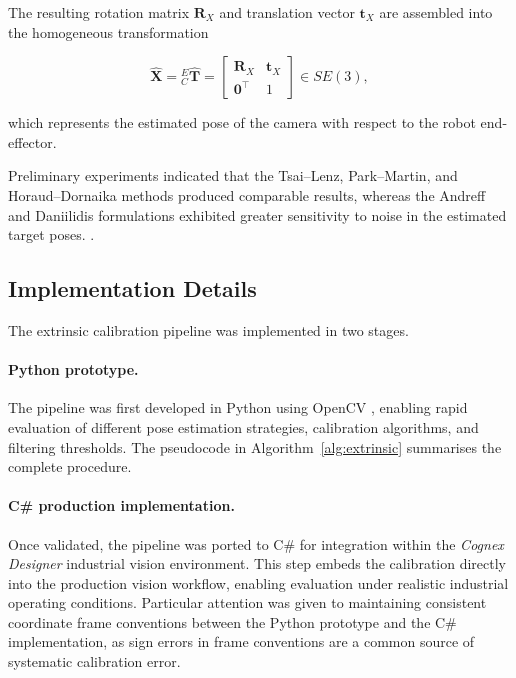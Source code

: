 The resulting rotation matrix $\mathbf{R}_X$ and translation vector
$\mathbf{t}_X$ are assembled into the homogeneous transformation

\begin{equation}
	\hat{\mathbf{X}}
	=
	{}^E_C\hat{\mathbf{T}}
	=
	\begin{bmatrix}
		\mathbf{R}_X & \mathbf{t}_X \\
		\mathbf{0}^{\top} & 1
	\end{bmatrix}
	\in SE(3),
	\label{eq:X_estimated}
\end{equation}

which represents the estimated pose of the camera with respect to the
robot end-effector.

Preliminary experiments indicated that the Tsai--Lenz,
Park--Martin, and Horaud--Dornaika methods produced comparable
results, whereas the Andreff and Daniilidis formulations exhibited
greater sensitivity to noise in the estimated target poses. .



\subsection{Implementation Details}
\label{subsec:extr_implementation}

The extrinsic calibration pipeline was implemented in two stages.

\paragraph{Python prototype.}
The pipeline was first developed in Python using OpenCV
\cite{bradski2008learning}, enabling rapid evaluation of different pose
estimation strategies, calibration algorithms, and filtering thresholds.
The pseudocode in Algorithm~\ref{alg:extrinsic} summarises the complete
procedure.

\paragraph{C\# production implementation.}
Once validated, the pipeline was ported to C\# for integration within the
\textit{Cognex Designer} industrial vision environment. This step embeds
the calibration directly into the production vision workflow, enabling
evaluation under realistic industrial operating conditions. Particular
attention was given to maintaining consistent coordinate frame conventions
between the Python prototype and the C\# implementation, as sign errors in
frame conventions are a common source of systematic calibration error.

